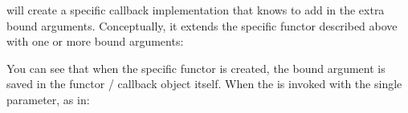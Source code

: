 \documentclass[letterpaper,10pt,english]{sphinxmanual}
\renewcommand{\sphinxcode}[1]{\texttt{\small{#1}}}
\begin{document}
will create a specific callback implementation that knows to add in the extra
bound arguments.  Conceptually, it extends the specific functor described above
with one or more bound arguments:

\begin{sphinxVerbatim}[commandchars=\\\{\}]
      
    
          
        
        
        

        
       
      
     
     
\end{sphinxVerbatim}

You can see that when the specific functor is created, the bound argument is saved
in the functor / callback object itself.  When the \sphinxcode{} is invoked with
the single parameter, as in:

\begin{sphinxVerbatim}[commandchars=\\\{\}]
 
\end{sphinxVerbatim}
\end{document}
